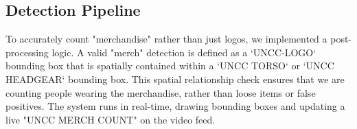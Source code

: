 \subsection{Detection Pipeline}
To accurately count "merchandise" rather than just logos, we implemented a post-processing logic. A valid "merch" detection is defined as a `UNCC-LOGO` bounding box that is spatially contained within a `UNCC TORSO` or `UNCC HEADGEAR` bounding box. This spatial relationship check ensures that we are counting people wearing the merchandise, rather than loose items or false positives. The system runs in real-time, drawing bounding boxes and updating a live "UNCC MERCH COUNT" on the video feed.
